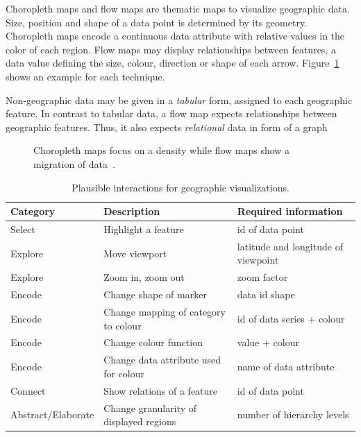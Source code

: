 Choropleth maps and flow maps are thematic maps to visualize geographic data.
Size, position and shape of a data point is determined by its geometry.
Choropleth maps encode a continuous data attribute with relative values in the color of each region.
Flow maps may display relationships between features, a data value defining the size, colour, direction or shape of each arrow.
Figure~\ref{fig:analysis:geographical} shows an example for each technique.

Non-geographic data may be given in a \emph{tabular} form, assigned to each geographic feature.
In contrast to tabular data, a flow map expects relationships between geographic features.
Thus, it also expects \emph{relational} data in form of a graph

\begin{figure}
  \centering
  \qquad
  \caption{Choropleth maps focus on a density while flow maps show a migration of data~\parencite{VisualizationCatalogue2017}.}%
  \label{fig:analysis:geographical}
\end{figure}

\begin{table}[H]
  \caption{Plausible interactions for geographic visualizations.}%
  \label{tab:analysis:geographical:interactions}
  \begin{tabularx}{\linewidth}{lXX}
    \bf Category & \bf Description & \bf Required information \\
    \hline
    Select & Highlight a feature & id of data point \\
    Explore & Move viewport & latitude and longitude of viewpoint \\
    Explore & Zoom in, zoom out & zoom factor \\
    Encode & Change shape of marker & data id  shape \\
    Encode & Change mapping of category to colour & id of data series + colour \\
    Encode & Change colour function & value + colour \\
    Encode & Change data attribute used for colour & name of data attribute \\
    Connect & Show relations of a feature & id of data point  \\
    Abstract/Elaborate & Change granularity of displayed regions & number of hierarchy levels \\
  \end{tabularx}
\end{table}

